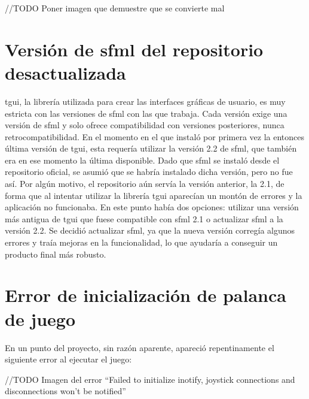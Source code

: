 	//TODO Poner imagen que demuestre que se convierte mal

\section{Versión de \acrshort{sfml} del repositorio desactualizada}

	\acrshort{tgui}, la librería utilizada para crear las interfaces gráficas de usuario, es muy estricta con las versiones de \acrshort{sfml} con las que trabaja. Cada versión exige una versión de \acrshort{sfml} y solo ofrece compatibilidad con versiones posteriores, nunca retrocompatibilidad. En el momento en el que instaló por primera vez la entonces última versión de \acrshort{tgui}, esta requería utilizar la versión 2.2 de \acrshort{sfml}, que también era en ese momento la última disponible. Dado que \acrshort{sfml} se instaló desde el repositorio oficial, se asumió que se habría instalado dicha versión, pero no fue así. Por algún motivo, el repositorio aún servía la versión anterior, la 2.1, de forma que al intentar utilizar la librería \acrshort{tgui} aparecían un montón de errores y la aplicación no funcionaba. En este punto había dos opciones: utilizar una versión más antigua de \acrshort{tgui} que fuese compatible con \acrshort{sfml} 2.1 o actualizar \acrshort{sfml} a la versión 2.2. Se decidió actualizar \acrshort{sfml}, ya que la nueva versión corregía algunos errores y traía mejoras en la funcionalidad, lo que ayudaría a conseguir un producto final más robusto.

\section{Error de inicialización de palanca de juego}

	En un punto del proyecto, sin razón aparente, apareció repentinamente el siguiente error al ejecutar el juego:

	//TODO Imagen del error ``Failed to initialize inotify, joystick connections and disconnections won't be notified''

